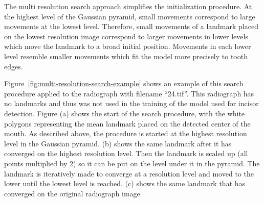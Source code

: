 \documentclass[a4paper]{article}
\begin{document}
The multi resolution search approach simplifies the initialization procedure. 
At the highest level of the Gaussian pyramid, small movements correspond to large movements at the lowest level. 
Therefore, small movements of a landmark placed on the lowest resolution image correspond to larger movements in lower levels which move the landmark to a broad initial position.
Movements in each lower level resemble smaller movements which fit the model more precisely to tooth edges.

Figure~\ref{fig:multi-resolution-search-example} shows an example of this search procedure applied to the radiograph with filename ``24.tif''. This radiograph has no landmarks and thus was not used in the training of the model used for incisor detection. Figure (a) shows the start of the search procedure, with the white polygons representing the mean landmark placed on the detected center of the mouth. As described above, the procedure is started at the highest resolution level in the Gaussian pyramid. (b) shows the same landmark after it has converged on the highest resolution level. Then the landmark is scaled up (all points multiplied by 2) so it can be put on the level under it in the pyramid. The landmark is iteratively made to converge at a resolution level and moved to the lower until the lowest level is reached. (c) shows the same landmark that has converged on the original radiograph image.
\end{document}
